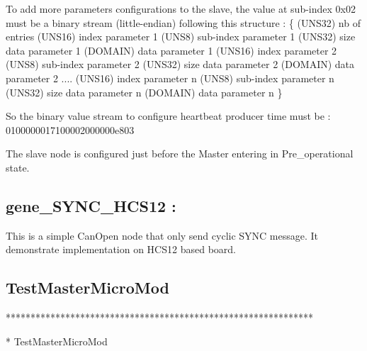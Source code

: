 \documentclass[a4paper,12pt]{book}
\begin{document}
{\sffamily
 To add more parameters configurations to the slave, the value at
sub{}-index 0x02 must be a binary stream (little{}-endian) following
this structure :\newline
\{
(UNS32) nb of entries\newline
(UNS16) index parameter 1\newline
(UNS8) sub{}-index parameter 1\newline
(UNS32) size data parameter 1\newline
(DOMAIN) data parameter 1\newline
(UNS16) index parameter 2\newline
(UNS8) sub{}-index parameter 2\newline
(UNS32) size data parameter 2\newline
(DOMAIN) data parameter 2\newline
\space \space \space \space \space ....\newline
(UNS16) index parameter n\newline
(UNS8) sub{}-index parameter n\newline
(UNS32) size data parameter n\newline
(DOMAIN) data parameter n\newline
\}
}

{\sffamily
 So the binary value stream to configure heartbeat producer time must be
:\newline
    0100000017100002000000e803}

{\sffamily
The slave node is configured just before the Master entering in
Pre\_operational state.}

\subsection{gene\_SYNC\_HCS12 :}
This is a simple CanOpen node that only send cyclic SYNC message. It
demonstrate implementation on HCS12 based board.


\bigskip

\subsection{TestMasterMicroMod }
{\ttfamily
**************************************************************}

{\ttfamily
* \space TestMasterMicroMod
\space \space \space \space \space \space \space \space \space \space \space \space \space \space \space \space \space \space \space \space \space \space \space \space \space \space \space \space \space \space \space \space \space \space \space \space \space \space \space *}
\end{document}
